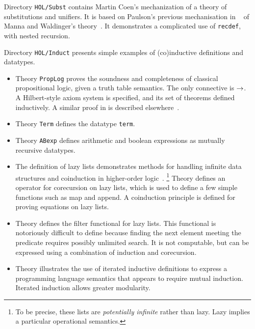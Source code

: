 Directory \texttt{HOL/Subst} contains Martin Coen's mechanization of a theory of
substitutions and unifiers.  It is based on Paulson's previous
mechanisation in {\LCF}~\cite{paulson85} of Manna and Waldinger's
theory~\cite{mw81}.  It demonstrates a complicated use of \texttt{recdef},
with nested recursion.

Directory \texttt{HOL/Induct} presents simple examples of (co)inductive
definitions and datatypes.
\begin{itemize}
\item Theory \texttt{PropLog} proves the soundness and completeness of
  classical propositional logic, given a truth table semantics.  The only
  connective is $\rightarrow$.  A Hilbert-style axiom system is specified, and its
  set of theorems defined inductively.  A similar proof in \ZF{} is
  described elsewhere~\cite{paulson-set-II}.

\item Theory \texttt{Term} defines the datatype \texttt{term}.

\item Theory \texttt{ABexp} defines arithmetic and boolean expressions
 as mutually recursive datatypes.

\item The definition of lazy lists demonstrates methods for handling
  infinite data structures and coinduction in higher-order
  logic~\cite{paulson-coind}.%
\footnote{To be precise, these lists are \emph{potentially infinite} rather
  than lazy.  Lazy implies a particular operational semantics.}
  Theory  defines an operator for
  corecursion on lazy lists, which is used to define a few simple functions
  such as map and append.   A coinduction principle is defined
  for proving equations on lazy lists.
  
\item Theory  defines the filter functional for lazy lists.
  This functional is notoriously difficult to define because finding the next
  element meeting the predicate requires possibly unlimited search.  It is not
  computable, but can be expressed using a combination of induction and
  corecursion.  

\item Theory  illustrates the use of iterated inductive definitions
  to express a programming language semantics that appears to require mutual
  induction.  Iterated induction allows greater modularity.
\end{itemize}

